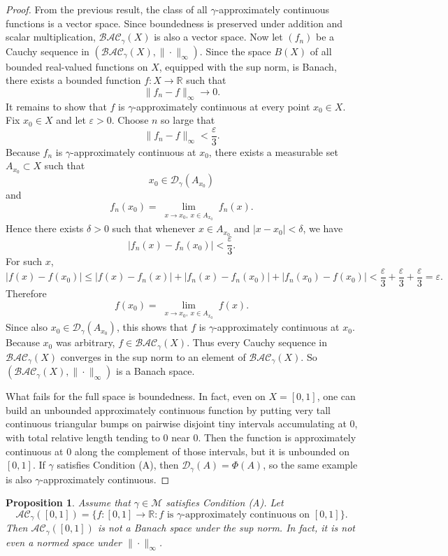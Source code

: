 \documentclass{amsart}
\theoremstyle{plain}
\newtheorem{proposition}{Proposition}
\numberwithin{equation}{section}
\begin{document}
\begin{proof}
From the previous result, the class of all $\gamma$-approximately continuous functions is a vector space. Since boundedness is preserved under addition and scalar multiplication, $\mathcal{BAC}_\gamma(X)$ is also a vector space.
Now let $(f_n)$ be a Cauchy sequence in $(\mathcal{BAC}_\gamma(X), \|\cdot\|_\infty)$. Since the space $B(X)$ of all bounded real-valued functions on $X$, equipped with the sup norm, is Banach, there exists a bounded function $f:X\to \mathbb{R}$ such that
$$\|f_n-f\|_\infty \to 0.$$
It remains to show that $f$ is $\gamma$-approximately continuous at every point $x_0\in X$.
Fix $x_0\in X$ and let $\varepsilon>0$. Choose $n$ so large that $$ \|f_n-f\|_\infty < \frac{\varepsilon}{3}. $$
Because $f_n$ is $\gamma$-approximately continuous at $x_0$, there exists a measurable set $A_{x_0}\subset X$ such that
$$x_0\in \mathcal{D}_\gamma(A_{x_0})$$
and
$$f_n(x_0)=\lim_{\substack{x\to x_0,\ x\in A_{x_0}}} f_n(x).$$
Hence there exists $\delta>0$ such that whenever $x\in A_{x_0}$ and $|x-x_0|<\delta$, we have
$$ |f_n(x)-f_n(x_0)|<\frac{\varepsilon}{3}.$$
For such $x$,
$$ |f(x)-f(x_0)| \leq |f(x)-f_n(x)|+|f_n(x)-f_n(x_0)|+|f_n(x_0)-f(x_0)| <
\frac{\varepsilon}{3}+\frac{\varepsilon}{3}+\frac{\varepsilon}{3}=\varepsilon.$$
Therefore
$$f(x_0)=\lim_{\substack{x\to x_0,\ x\in A_{x_0}}} f(x).$$
Since also $x_0\in \mathcal{D}_\gamma(A_{x_0})$, this shows that $f$ is $\gamma$-approximately continuous at $x_0$.
Because $x_0$ was arbitrary, $f\in \mathcal{BAC}_\gamma(X)$. Thus every Cauchy sequence in $\mathcal{BAC}_\gamma(X)$ converges in the sup norm to an element of $\mathcal{BAC}_\gamma(X)$. So $(\mathcal{BAC}_\gamma(X), \|\cdot\|_\infty)$ is a Banach space. 

What fails for the full space is boundedness. In fact, even on $X=[0,1]$, one can build an unbounded approximately continuous function by putting very tall continuous triangular bumps on pairwise disjoint tiny intervals accumulating at $0$, with total relative length tending to $0$ near $0$. Then the function is approximately continuous at $0$ along the complement of those intervals, but it is unbounded on $[0,1]$. If $\gamma$ satisfies Condition (A), then $\mathcal{D}_\gamma(A)=\Phi(A)$, so the same example is also $\gamma$-approximately continuous.
\end{proof}
\begin{proposition}
Assume that $\gamma\in \mathcal{M}$ satisfies Condition (A). Let $$ \mathcal{AC}_\gamma([0,1])=\{f:[0,1]\to \mathbb{R}: f \text{ is } \gamma\text{-approximately continuous on } [0,1]\}.
$$
Then $\mathcal{AC}_\gamma([0,1])$ is not a Banach space under the sup norm. In fact, it is not even a normed space under $\|\cdot\|_\infty$.
\end{proposition}
\end{document}
